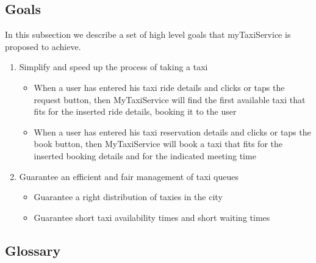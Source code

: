 \documentclass[11pt]{article} %
\begin{document}
    \subsection{Goals}
      In this subsection we describe a set of high level goals that myTaxiService is proposed to achieve.\newline
      \begin{enumerate}
        \item Simplify and speed up the process of taking a taxi
        \begin{itemize}
          \item When a user has entered his taxi ride details and clicks or taps
          the request button, then MyTaxiService will find the first
          available taxi that fits for the inserted ride details, booking it to the user

          \item When a user has entered his taxi reservation details and clicks or taps
          the book button, then MyTaxiService will book a taxi that fits for the
          inserted booking details and for the indicated meeting time
        \end{itemize}
        \item Guarantee an efficient and fair management of taxi queues
        \begin{itemize}
          \item Guarantee a right distribution of taxies in the city
          \item Guarantee short taxi availability times and short waiting times
         \end{itemize}
      \end{enumerate}
    \subsection{Glossary}
\end{document}
